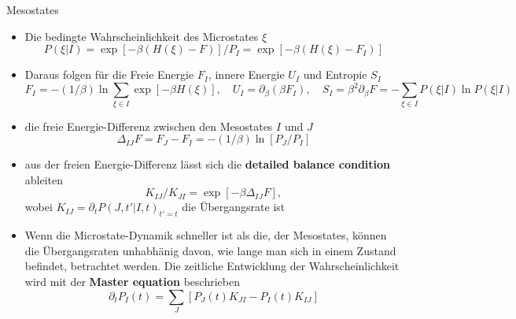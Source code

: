 \documentclass[aspectratio=1610, 9pt]{beamer}
\begin{document}
\begin{frame}{Mesostates}
\begin{itemize}
\begin{minipage}{0.25\textwidth}
\begin{center}
        \end{center}
      \end{minipage}
      \item Die bedingte Wahrscheinlichkeit des Microstates $\xi$
      \begin{equation*}
      P(\xi|I)= \exp[-\beta \left( H(\xi) - F\right) ] / P_I  = \exp[-\beta \left( H(\xi) - F_I\right) ]
      \end{equation*}
      \item Daraus folgen für die Freie Energie $F_I$, innere Energie $U_I$ und Entropie $S_I$ 
      \begin{equation*}
        F_I=-(1 / \beta )\ln\sum_{\xi \in I }\exp[-\beta H(\xi)], \quad U_I=\partial_{\beta}(\beta F_I), \quad S_I = \beta^2 \partial_\beta F = - \sum_{\xi \in I }   P(\xi|I) \ln   P(\xi|I)
      \end{equation*}
    \end{itemize}
\end{frame}%

\begin{frame}{}%
  \begin{itemize}
    \item die freie Energie-Differenz zwischen den Mesostates $I$ und $J$
    \begin{equation*}
      \Delta_{IJ}F = F_J - F_I = - (1 / \beta )\ln[P_J / P_I]
    \end{equation*}
    \item aus der freien Energie-Differenz lässt sich die \textbf{detailed balance condition} ableiten
    \begin{equation}
        K_{I J} / K_{ J I} = \exp[-\beta \Delta_{IJ}F ],
    \end{equation}
    wobei $ K_{I J} = \partial_t P(J,t'|I,t)_{t'=t}$ die Übergangsrate ist
    \item Wenn die Microstate-Dynamik schneller ist als die, der Mesostates,
    können die Übergangsraten unhabhänig davon, wie lange man sich in einem Zustand befindet, betrachtet werden.
    Die zeitliche Entwicklung der Wahrscheinlichkeit wird mit der \textbf{Master equation} beschrieben
    \begin{equation}
      \partial_t P_I(t) = \sum_J[ P_J(t)K_{J I}- P_I(t)K_{I J}]
    \end{equation}
  \end{itemize}
\end{frame}%
\end{document}
